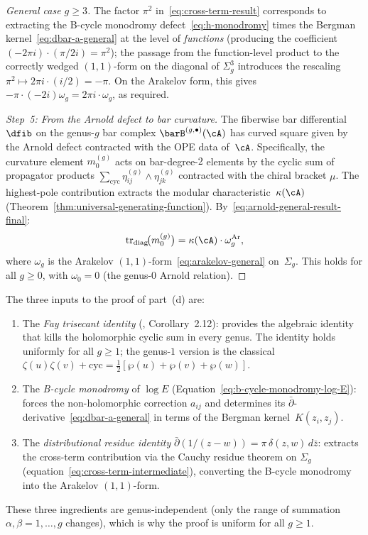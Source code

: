 \begin{proof}[General case $g \geq 3$]
The factor $\pi^2$ in~\eqref{eq:cross-term-result}
corresponds to extracting the B-cycle monodromy
defect~\eqref{eq:h-monodromy} times the Bergman
kernel~\eqref{eq:dbar-a-general} at the level of
\emph{functions} (producing the coefficient
$(-2\pi i)\cdot(\pi/2i) = \pi^2$); the passage from the
function-level product to the correctly wedged
$(1,1)$-form on the diagonal of $\Sigma_g^3$ introduces
the rescaling $\pi^2 \mapsto 2\pi i \cdot (i/2) = -\pi$.
On the Arakelov form, this gives
$-\pi\cdot(-2i)\omega_g = 2\pi i\cdot\omega_g$,
as required.

\emph{Step~5: From the Arnold defect to bar curvature.}
The fiberwise bar differential $\dfib$ on the genus-$g$
bar complex $\barB^{(g,\bullet)}(\cA)$ has curved square given by
the Arnold defect contracted with the OPE data of~$\cA$.
Specifically, the curvature element $m_0^{(g)}$ acts on
bar-degree-$2$ elements by the cyclic sum of propagator
products $\sum_{\mathrm{cyc}}
\eta_{ij}^{(g)} \wedge \eta_{jk}^{(g)}$ contracted
with the chiral bracket $\mu$. The highest-pole
contribution extracts the modular
characteristic~$\kappa(\cA)$
(Theorem~\ref{thm:universal-generating-function}).
By~\eqref{eq:arnold-general-result-final}:
\begin{equation}\label{eq:d-squared-general-genus}
\operatorname{tr}_{\mathrm{diag}}\!\bigl(m_0^{(g)}\bigr)
= \kappa(\cA)\cdot\omega_g^{\mathrm{Ar}},
\end{equation}
where $\omega_g$ is the Arakelov $(1,1)$-form~\eqref{eq:arakelov-general}
on~$\Sigma_g$. This holds for all $g \geq 0$,
with $\omega_0 = 0$ (the genus-$0$ Arnold relation).
\end{proof}

\begin{remark}\label{rem:proof-structure-fay}
The three inputs to the proof of part~(d) are:
\begin{enumerate}
\item The \emph{Fay trisecant identity}
(\cite{Fay73}, Corollary~2.12): provides the algebraic
identity that kills the holomorphic cyclic sum in every genus.
The identity holds uniformly for all $g \geq 1$; the genus-$1$
version is the classical
$\zeta(u)\zeta(v) + \text{cyc} = \frac{1}{2}[\wp(u) + \wp(v) + \wp(w)]$.
\item The \emph{B-cycle monodromy} of $\log E$
(Equation~\eqref{eq:b-cycle-monodromy-log-E}): forces the
non-holomorphic correction $a_{ij}$ and determines its
$\bar\partial$-derivative~\eqref{eq:dbar-a-general} in terms of
the Bergman kernel~$K(z_i, z_j)$.
\item The \emph{distributional residue identity}
$\bar\partial(1/(z-w)) = \pi\,\delta(z,w)\,d\bar{z}$:
extracts the cross-term contribution via the Cauchy
residue theorem on $\Sigma_g$
(equation~\eqref{eq:cross-term-intermediate}), converting
the B-cycle monodromy into the Arakelov $(1,1)$-form.
\end{enumerate}
These three ingredients are genus-independent
(only the range of summation $\alpha,\beta = 1,\ldots,g$
changes), which is why the proof is uniform for all $g \geq 1$.
\end{remark}

